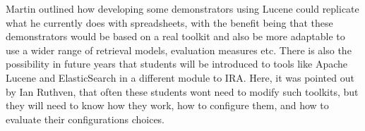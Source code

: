 Martin outlined how developing some demonstrators using Lucene could replicate what he currently does with spreadsheets, with the benefit being that these demonstrators would be based on a real toolkit and also be more adaptable to use a wider range of retrieval models, evaluation measures etc. There is also the possibility in future years that students will be introduced to tools like Apache Lucene and ElasticSearch in a different module to IRA. Here, it was pointed out by Ian Ruthven, that often these students wont need to modify such toolkits, but they will need to know how they work, how to configure them, and how to evaluate their configurations choices.\\

